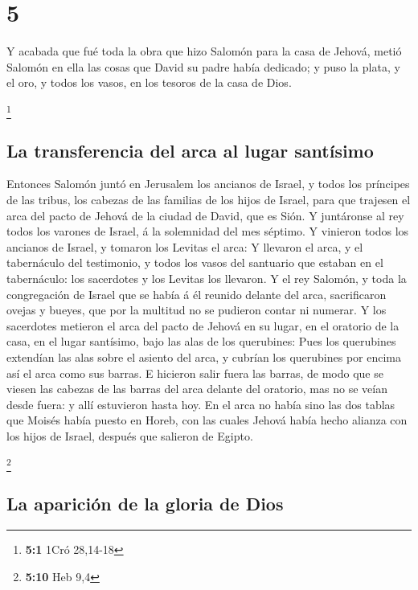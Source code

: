 \hypertarget{section-4}{%
\section{5}\label{section-4}}

 Y acabada que fué toda la obra que hizo Salomón para la
casa de Jehová, metió Salomón en ella las cosas que David su padre había
dedicado; y puso la plata, y el oro, y todos los vasos, en los tesoros
de la casa de Dios.

\footnote{\textbf{5:1} 1Cró 28,14-18}

\hypertarget{la-transferencia-del-arca-al-lugar-santuxedsimo}{%
\subsection{La transferencia del arca al lugar
santísimo}\label{la-transferencia-del-arca-al-lugar-santuxedsimo}}

 Entonces Salomón juntó en Jerusalem los ancianos de Israel,
y todos los príncipes de las tribus, los cabezas de las familias de los
hijos de Israel, para que trajesen el arca del pacto de Jehová de la
ciudad de David, que es Sión.  Y juntáronse al rey todos los
varones de Israel, á la solemnidad del mes séptimo.  Y
vinieron todos los ancianos de Israel, y tomaron los Levitas el arca:
 Y llevaron el arca, y el tabernáculo del testimonio, y
todos los vasos del santuario que estaban en el tabernáculo: los
sacerdotes y los Levitas los llevaron.  Y el rey Salomón, y
toda la congregación de Israel que se había á él reunido delante del
arca, sacrificaron ovejas y bueyes, que por la multitud no se pudieron
contar ni numerar.  Y los sacerdotes metieron el arca del
pacto de Jehová en su lugar, en el oratorio de la casa, en el lugar
santísimo, bajo las alas de los querubines:  Pues los
querubines extendían las alas sobre el asiento del arca, y cubrían los
querubines por encima así el arca como sus barras.  E
hicieron salir fuera las barras, de modo que se viesen las cabezas de
las barras del arca delante del oratorio, mas no se veían desde fuera: y
allí estuvieron hasta hoy.  En el arca no había sino las
dos tablas que Moisés había puesto en Horeb, con las cuales Jehová había
hecho alianza con los hijos de Israel, después que salieron de Egipto.

\footnote{\textbf{5:10} Heb 9,4}

\hypertarget{la-apariciuxf3n-de-la-gloria-de-dios}{%
\subsection{La aparición de la gloria de
Dios}\label{la-apariciuxf3n-de-la-gloria-de-dios}}

